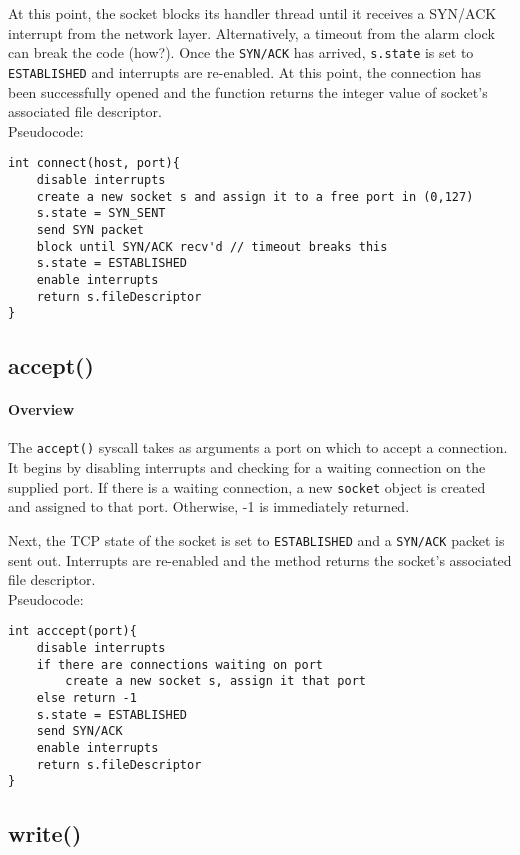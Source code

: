 \documentclass[]{article}
\begin{document}
At this point, the socket blocks its handler thread until it receives a SYN/ACK interrupt from the network layer. Alternatively, a timeout from the alarm clock can break the code (how?). Once the \texttt{SYN/ACK} has arrived, \texttt{s.state} is set to \texttt{ESTABLISHED} and interrupts are re-enabled. At this point, the connection has been successfully opened and the function returns the integer value of socket's associated file descriptor. \\






\noindent Pseudocode:

\begin{lstlisting}
int connect(host, port){
	disable interrupts
	create a new socket s and assign it to a free port in (0,127)
	s.state = SYN_SENT
	send SYN packet
	block until SYN/ACK recv'd // timeout breaks this
	s.state = ESTABLISHED
	enable interrupts
	return s.fileDescriptor
}
\end{lstlisting}

\subsection{accept()}
\paragraph{Overview}
The \texttt{accept()} syscall takes as arguments a port on which to accept a connection. It begins by disabling interrupts and checking for a waiting connection on the supplied port. If there is a waiting connection, a new \texttt{socket} object is created and assigned to that port. Otherwise, -1 is immediately returned.

Next, the TCP state of the socket is set to \texttt{ESTABLISHED} and a \texttt{SYN/ACK} packet is sent out. Interrupts are re-enabled and the method returns the socket's associated file descriptor.\\

\noindent Pseudocode:

\begin{lstlisting}
int acccept(port){
	disable interrupts
	if there are connections waiting on port
		create a new socket s, assign it that port
	else return -1
	s.state = ESTABLISHED
	send SYN/ACK
	enable interrupts
	return s.fileDescriptor
}
\end{lstlisting}

\subsection{write()}
\end{document}
